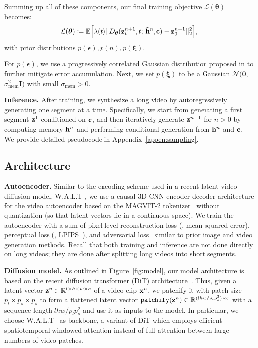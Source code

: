 Summing up all of these components, our final training objective $\mathcal{L}(\bm{\theta})$ becomes:
\begin{align}
    \mathcal{L}(\bm{\theta}) \coloneqq \mathbb{E} 
    \Big[
    \lambda(t)|| D_{\bm{\theta}}(\mathbf{z}_t^{n+1}, t;\, \tilde{\mathbf{h}}^{n}, \mathbf{c}) - \mathbf{z}_0^{n+1}||_2^2 
    \Big],
\label{eq:obj}
\end{align}
with prior distributions $p(\bm{\epsilon}), p(n), p(\bm{\xi})$.

For $p(\bm{\epsilon})$, we use a progressively correlated Gaussian distribution proposed in \citet{ge2023preserve} to further mitigate error accumulation. Next, we set $p(\bm{\xi})$ to be a Gaussian $\mathcal{N}(\mathbf{0}$, $\sigma_{\mathrm{mem}}^2\mathbf{I})$ with small $\sigma_{\mathrm{mem}}>0$.

\vspace{0.02in}
\noindent\textbf{Inference.}
After training, we synthesize a long video by autoregressively generating one segment at a time. Specifically, we start from generating a first segment $\mathbf{z}^{1}$ conditioned on $\mathbf{c}$, and then iteratively generate $\mathbf{z}^{n+1}$ for $n>0$ by computing memory $\mathbf{h}^{n}$ and performing conditional generation from $\mathbf{h}^{n}$ and $\mathbf{c}$. We provide detailed pseudocode in Appendix~\ref{appen:sampling}.

\subsection{Architecture}
\label{subsec:arch}

\textbf{Autoencoder.}
Similar to the encoding scheme used in a recent latent video diffusion model, W.A.L.T \citep{gupta2023photorealistic}, we use a
causal 3D CNN encoder-decoder architecture for the video autoencoder based on the  
MAGVIT-2 tokenizer~\citep{yu2024language} without quantization (so that latent vectors lie in a continuous space). We train the autoencoder with a sum of pixel-level reconstruction loss (\eg, mean-squared error), perceptual loss (\eg, LPIPS~\citep{zhang2018perceptual}), and adversarial loss~\citep{goodfellow2014generative} similar to prior image and video generation methods. Recall that both training and inference are not done directly on long videos; they are done after splitting long videos into short segments.

\vspace{0.02in}
\noindent\textbf{Diffusion model.}
As outlined in Figure~\ref{fig:model}, our model architecture is based on the recent diffusion transformer (DiT) architecture~\citep{Peebles2022DiT, ma2024latte, yu2024representation}. 
Thus, given a latent vector $\mathbf{z}^n \in \mathbb{R}^{l \times h \times w \times c}$ of a video clip $\mathbf{x}^n$, we patchify it with patch size $p_l \times p_s \times p_s$ to form a flattened latent vector $\mathtt{patchify}(\mathbf{z}^n) \in \mathbb{R}^{(lhw / p_lp_s^2) \times c}$ with a sequence length $lhw / p_lp_s^2$ and use it as inputs to the model. In particular, we choose W.A.L.T~\citep{gupta2023photorealistic} as backbone, a variant of DiT which employs efficient spatiotemporal windowed attention instead of full attention between large numbers of video patches.

